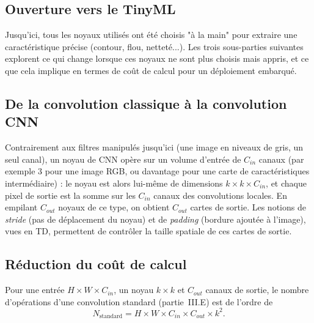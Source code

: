 \subsection{Ouverture vers le TinyML}
\label{sec:tinyml}

Jusqu'ici, tous les noyaux utilisés ont été choisis "à la main" pour extraire une caractéristique précise (contour, flou, netteté...). Les trois sous-parties suivantes explorent ce qui change lorsque ces noyaux ne sont plus choisis mais appris, et ce que cela implique en termes de coût de calcul pour un déploiement embarqué. \\

\subsection{De la convolution classique à la convolution CNN}

Contrairement aux filtres manipulés jusqu'ici (une image en niveaux de gris, un seul canal), un noyau de CNN opère sur un volume d'entrée de $C_{in}$ canaux (par exemple 3 pour une image RGB, ou davantage pour une carte de caractéristiques intermédiaire) : le noyau est alors lui-même de dimensions $k\times k\times C_{in}$, et chaque pixel de sortie est la somme sur les $C_{in}$ canaux des convolutions locales. En empilant $C_{out}$ noyaux de ce type, on obtient $C_{out}$ cartes de sortie. Les notions de \emph{stride} (pas de déplacement du noyau) et de \emph{padding} (bordure ajoutée à l'image), vues en TD, permettent de contrôler la taille spatiale de ces cartes de sortie. \\

% 



\subsection{Réduction du coût de calcul}

Pour une entrée $H\times W\times C_{in}$, un noyau $k\times k$ et $C_{out}$ canaux de sortie, le nombre d'opérations d'une convolution standard (partie~III.E) est de l'ordre de
\[
N_{\text{standard}}=H\times W\times C_{in}\times C_{out}\times k^2.
\]

